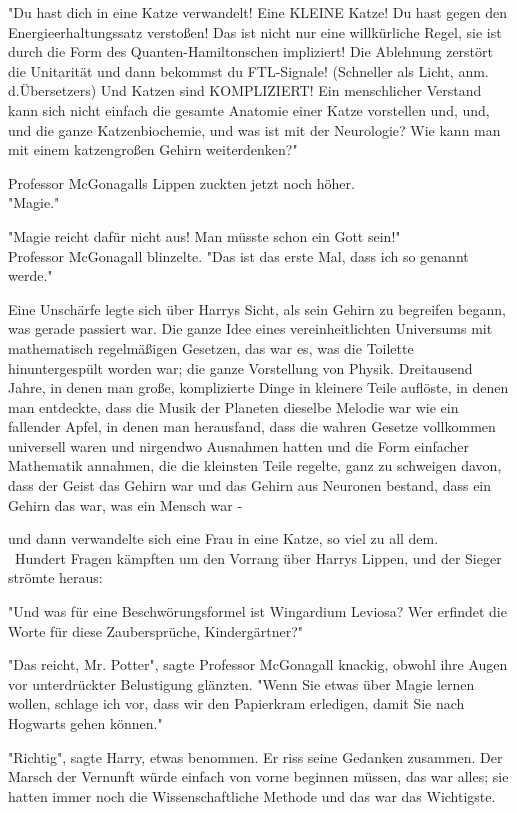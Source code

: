 {"Du hast dich in eine Katze verwandelt! Eine KLEINE Katze! Du hast gegen den Energieerhaltungssatz verstoßen! Das ist nicht nur eine willkürliche Regel, sie ist durch die Form des Quanten-Hamiltonschen impliziert! Die Ablehnung zerstört die Unitarität und dann bekommst du FTL-Signale! (Schneller als Licht, anm. d.Übersetzers) Und Katzen sind KOMPLIZIERT! Ein menschlicher Verstand kann sich nicht einfach die gesamte Anatomie einer Katze vorstellen und, und, und die ganze Katzenbiochemie, und was ist mit der Neurologie? Wie kann man mit einem katzengroßen Gehirn weiterdenken?" ~ ~

Professor McGonagalls Lippen zuckten jetzt noch höher.\\ "Magie." ~ ~

"Magie reicht dafür nicht aus! Man müsste schon ein Gott sein!" ~ ~\\ Professor McGonagall blinzelte. "Das ist das erste Mal, dass ich so genannt werde."

Eine Unschärfe legte sich über Harrys Sicht, als sein Gehirn zu begreifen begann, was gerade passiert war. Die ganze Idee eines vereinheitlichten Universums mit mathematisch regelmäßigen Gesetzen, das war es, was die Toilette hinuntergespült worden war; die ganze Vorstellung von Physik. Dreitausend Jahre, in denen man große, komplizierte Dinge in kleinere Teile auflöste, in denen man entdeckte, dass die Musik der Planeten dieselbe Melodie war wie ein fallender Apfel, in denen man herausfand, dass die wahren Gesetze vollkommen universell waren und nirgendwo Ausnahmen hatten und die Form einfacher Mathematik annahmen, die die kleinsten Teile regelte, ganz zu schweigen davon, dass der Geist das Gehirn war und das Gehirn aus Neuronen bestand, dass ein Gehirn das war, was ein Mensch war -

und dann verwandelte sich eine Frau in eine Katze, so viel zu all dem. ~ ~Hundert Fragen kämpften um den Vorrang über Harrys Lippen, und der Sieger strömte heraus:

"Und was für eine Beschwörungsformel ist Wingardium Leviosa? Wer erfindet die Worte für diese Zaubersprüche, Kindergärtner?" ~ ~

"Das reicht, Mr. Potter", sagte Professor McGonagall knackig, obwohl ihre Augen vor unterdrückter Belustigung glänzten. "Wenn Sie etwas über Magie lernen wollen, schlage ich vor, dass wir den Papierkram erledigen, damit Sie nach Hogwarts gehen können." ~ ~

"Richtig", sagte Harry, etwas benommen. Er riss seine Gedanken zusammen. Der Marsch der Vernunft würde einfach von vorne beginnen müssen, das war alles; sie hatten immer noch die Wissenschaftliche Methode und das war das Wichtigste.

}
